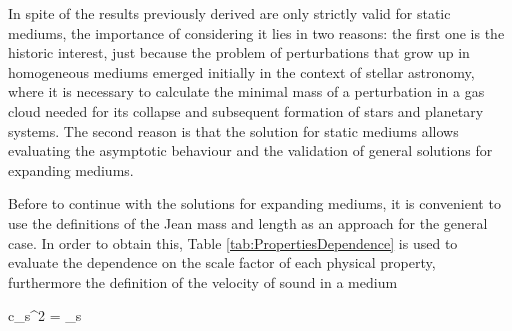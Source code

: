 In spite of the results previously derived are only strictly valid for 
static mediums, the importance of considering it lies in two reasons: the
first one is the historic interest, just because the problem of 
perturbations that grow up in homogeneous mediums emerged initially in the 
context of stellar astronomy, where it is necessary to calculate the 
minimal mass of a perturbation in a gas cloud needed for its collapse and 
subsequent formation of stars and planetary systems. The second reason is 
that the solution for static mediums allows evaluating the asymptotic 
behaviour and the validation of general solutions for expanding mediums.


Before to continue with the solutions for expanding mediums, it is 
convenient to use the definitions of the Jean mass and length as an 
approach for the general case. In order to obtain this, Table 
\ref{tab:PropertiesDependence} is used to evaluate the dependence on the
scale factor of each physical property, furthermore the definition of the 
velocity of sound in a medium \cite{pathria1996}

	

{ c_s^2 = _s }



